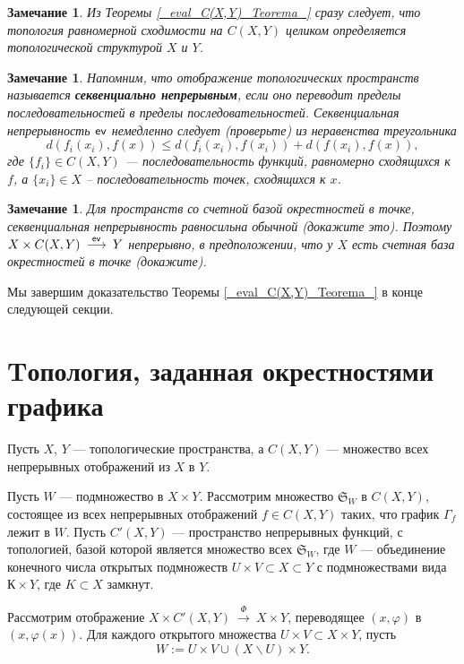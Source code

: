 \documentclass[12pt]{book}
\newcommand{\arrow}{{\:\longrightarrow\:}}
\renewcommand{\phi}{\varphi}
\newcommand{\ev}{\operatorname{\sf ev}}
\theoremstyle{upshape}
\newtheorem{zadacha}{Задача}[chapter]
\theoremstyle{generic}
\newtheorem{remark}[teorema]{Замечание}
\def\замечание{\begin{remark}}
\def\еза{\end{remark}}
\theoremstyle{upshapenonumber}
\newcommand{\следствие}{%
     \refstepcounter{teorema}
     {\noindent\bf Следствие \thechapter.\arabic{teorema}:\ }}
\newcommand{\пример}{%
     \refstepcounter{teorema}
     {\noindent\bf Пример \thechapter.\arabic{teorema}:\ }}
\newcommand{\лемма}{%
     \refstepcounter{teorema}
     {\noindent\bf Лемма \thechapter.\arabic{teorema}:\ }}
\newcommand{\теорема}{%
     \refstepcounter{teorema}
     {\noindent\bf Теорема \thechapter.\arabic{teorema}:\ }}
\newcommand{\утверждение}{%
     \refstepcounter{teorema}
     {\noindent\bf Утверждение \thechapter.\arabic{teorema}:\ }}
\def\бф{\bf}
\def\ем{\em}
\def\задача{\begin{zadacha}}
\def\ез{\end{zadacha}}
\def\еу{\end{ukazanie}}
\def\ео{\end{opredelenie}}
\def\goth{\mathfrak}
\def\енум{\begin{enumerate}}
\def\ее{\end{enumerate}}
\begin{document}
\замечание
Из Теоремы \ref{_eval_C(X,Y)_Teorema_}
сразу следует, что топология равномерной
сходимости на $C(X,Y)$ целиком определяется
топологической структурой $X$ и $Y$.
\еза

\замечание
Напомним, что отображение топологических
прост\-ранств называется {\бф секвенциально непрерывным},
если оно переводит пределы последовательностей
в пределы последовательностей. Секвенциальная
непрерывность $\ev$ немедленно следует (проверьте) 
из неравенства треугольника
\[
d(f_i(x_i), f(x)) \leq d(f_i(x_i), f(x_i)) + d(f(x_i), f(x)),
\]
где $\{f_i\}\in C(X,Y)$ --- последовательность
функций, равномерно сходящихся к $f$, а $\{x_i\}\in X$ --
последовательность точек, сходящихся к $x$.
\еза

\замечание
Для пространств со счетной базой окрестностей в точке, 
секвенциальная непрерывность равносильна обычной
(докажите это). Поэтому $X \times C(X,Y) \stackrel{\ev}\arrow Y$
непрерывно, в предположении, что у $X$ есть счетная
база окрестностей в точке (докажите).
\еза

Мы завершим доказательство Теоремы 
\ref{_eval_C(X,Y)_Teorema_}
в конце следующей секции.


\section{Tопология, заданная окрестностями графика}


Пусть $X$, $Y$ --- топологические пространства,
а $C(X,Y)$ --- множество всех непрерывных отображений
из $X$ в $Y$.

Пусть $W$ --- подмножество
в $X\times Y$. Рассмотрим множество ${\goth S}_W$ в $C(X, Y)$,
состоящее из всех непрерывных отображений
$f\in C(X,Y)$ таких, что график $\Gamma_{f}$ лежит в $W$.
Пусть $C'(X,Y)$ --- пространство непрерывных функций,
с топологией, базой которой является множество всех
${\goth S}_W$, где $W$ --- объединение конечного числа открытых подмножеств
$U \times V\subset X\subset Y$ с подмножествами вида $К \times Y$,
где $K \subset X$ замкнут.

Рассмотрим отображение 
$X \times C'(X,Y)\stackrel \Phi\arrow X \times Y$,
переводящее $(x, \phi)$ в $(x, \phi(x))$.
Для каждого открытого множества 
$U\times V \subset X \times Y$,
пусть
\[ W:=U\times V \cup (X \backslash U) \times Y.\]
\end{document}
